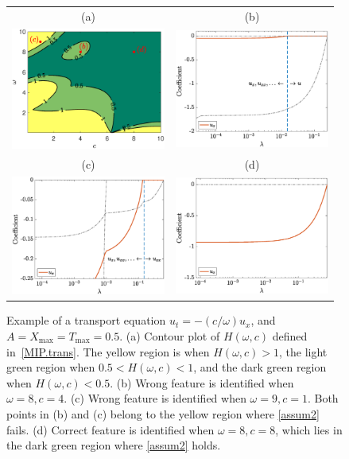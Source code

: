 \documentclass[a4paper,11pt]{article}
\theoremstyle{definition}
\begin{document}
\begin{figure}
\centering
\begin{tabular}{cc}
(a)&(b)\\
\includegraphics[width=2in]{Figures/Figure11_a.eps}&
\includegraphics[width=2in]{Figures/Figure11_b.eps}\\
(c)&(d)\\
\includegraphics[width=2in]{Figures/Figure11_c.eps}&
\includegraphics[width=2in]{Figures/Figure11_d.eps}
\end{tabular}
\caption{Example of a transport equation $u_t=-(c/\omega)u_x$, and $A=X_{\max}=T_{\max}=0.5$.  (a) Contour plot of $H(\omega,c)$ defined in~\eqref{MIP.trans}. The yellow region is when $H(\omega,c)>1$, the light green region when $0.5<H(\omega,c)<1$, and  the dark green region when $H(\omega,c)<0.5$.  (b) Wrong feature is identified when $\omega=8,c=4$.  (c) Wrong feature is identified when $\omega=9,c=1$. Both points in (b) and (c) belong to the yellow region where \eqref{assum2} fails. (d) Correct feature is identified when $\omega=8,c=8$, which lies in the dark green region where \eqref{assum2} holds.}	\label{MIPtestExample}
\end{figure}
\end{document}
